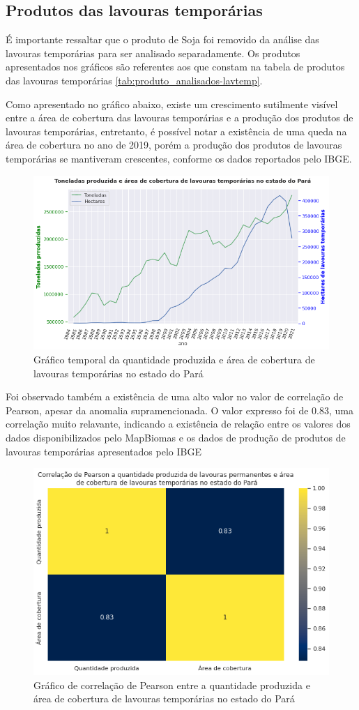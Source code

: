 \subsection{Produtos das lavouras temporárias}

É importante ressaltar que o produto de Soja foi removido da análise das lavouras temporárias para ser analisado separadamente. Os produtos apresentados nos gráficos são referentes aos que constam na tabela de produtos das lavouras temporárias \ref{tab:produto_analisados-lavtemp}.

Como apresentado no gráfico abaixo, existe um crescimento sutilmente visível entre a área de cobertura das lavouras temporárias e a produção dos produtos de lavouras temporárias, entretanto, é possível notar a existência de uma queda na área de cobertura no ano de 2019, porém a produção dos produtos de lavouras temporárias se mantiveram crescentes, conforme os dados reportados pelo IBGE.

\begin{figure}[hbt!]
    \centering
    \includegraphics[width=0.6\columnwidth]{src/plots/plot-lavouras_temp.png}
    \centering
    \caption{Gráfico temporal da quantidade produzida e área de cobertura de lavouras temporárias no estado do Pará}
    \label{fig:cobertura_pastagem-numero_cabeca}
\end{figure}

Foi observado também a existência de uma alto valor no valor de correlação de Pearson, apesar da anomalia supramencionada. O valor expresso foi de 0.83, uma correlação muito relavante, indicando a existência de relação entre os valores dos dados disponibilizados pelo MapBiomas e os dados de produção de produtos de lavouras temporárias apresentados pelo IBGE

\begin{figure}[hbt!]
    \centering
    \includegraphics[width=0.6\columnwidth]{src/plots/plot_correlacao-lavouras_temp.png}
    \centering
    \caption{Gráfico de correlação de Pearson entre a quantidade produzida e área de cobertura de lavouras temporárias no estado do Pará}
    \label{fig:correlacao-cobertura_pastagem-numero_cabecas}
\end{figure}

